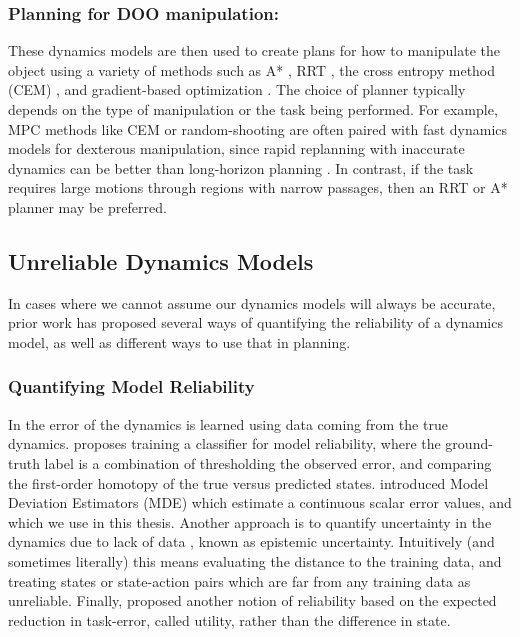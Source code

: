 \subsubsection{Planning for DOO manipulation:}

These dynamics models are then used to create plans for how to manipulate the object using a variety of methods such as A* \cite{Wang2019}, RRT \cite{Ichter2019}, the cross entropy method (CEM) \cite{Hafner2019}, and gradient-based optimization \cite{Srinivas2018}. The choice of planner typically depends on the type of manipulation or the task being performed. For example, MPC methods like CEM or random-shooting are often paired with fast dynamics models for dexterous manipulation, since rapid replanning with inaccurate dynamics can be better than long-horizon planning \cite{Finn2017,NagabandiImageConditiondDynamics2018,Nagabandi2018}. In contrast, if the task requires large motions through regions with narrow passages, then an RRT or A* planner may be preferred.

\subsection{Unreliable Dynamics Models}

In cases where we cannot assume our dynamics models will always be accurate, prior work has proposed several ways of quantifying the reliability of a dynamics model, as well as different ways to use that in planning.

\subsubsection{Quantifying Model Reliability}

In \cite{MDEs22,PatchPlans2020} the error of the dynamics is learned using data coming from the true dynamics. \cite{UnreliableDale2019} proposes training a classifier for model reliability, where the ground-truth label is a combination of thresholding the observed error, and comparing the first-order homotopy of the true versus predicted states. \cite{MDEs22} introduced Model Deviation Estimators (MDE) which estimate a continuous scalar error values, and which we use in this thesis. Another approach is to quantify uncertainty in the dynamics due to lack of data \cite{Lakshminarayanan2017,Chua2018,CraigLipshitz2021}, known as epistemic uncertainty. Intuitively (and sometimes literally) this means evaluating the distance to the training data, and treating states or state-action pairs which are far from any training data as unreliable. Finally, \cite{DaleBandit} proposed another notion of reliability based on the expected reduction in task-error, called utility, rather than the difference in state.

